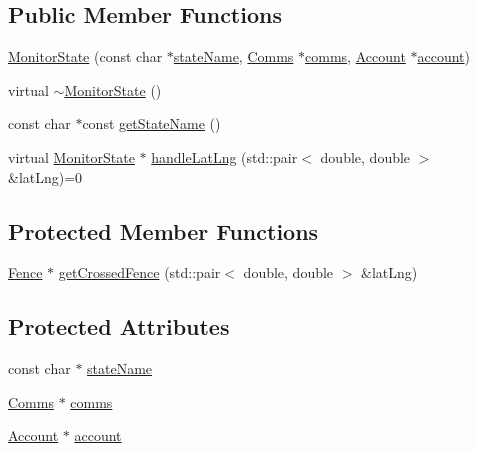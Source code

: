 \subsection*{Public Member Functions}
\begin{DoxyCompactItemize}
\item 
\hyperlink{class_monitor_state_ace027ab9e5703ac4e4b808eeebc3c961}{Monitor\+State} (const char $\ast$\hyperlink{class_monitor_state_aaeef0ae307bb9cfcbb4fcb08c115fb0f}{state\+Name}, \hyperlink{class_comms}{Comms} $\ast$\hyperlink{class_monitor_state_a41914e9963c67ef2d17774f04bad3518}{comms}, \hyperlink{class_account}{Account} $\ast$\hyperlink{class_monitor_state_a41128d4942ec0d5b107c63d1d95af811}{account})
\item 
virtual \hyperlink{class_monitor_state_a8dc9d7a46aa3d0190ec65b0d56167d3e}{$\sim$\+Monitor\+State} ()
\item 
const char $\ast$const \hyperlink{class_monitor_state_acb6d3a4de174058cb5b167fc04929ddb}{get\+State\+Name} ()
\item 
virtual \hyperlink{class_monitor_state}{Monitor\+State} $\ast$ \hyperlink{class_monitor_state_a8c8b871e3e8308e11f35905dd8741878}{handle\+Lat\+Lng} (std\+::pair$<$ double, double $>$ \&lat\+Lng)=0
\end{DoxyCompactItemize}
\subsection*{Protected Member Functions}
\begin{DoxyCompactItemize}
\item 
\hyperlink{class_fence}{Fence} $\ast$ \hyperlink{class_monitor_state_a332c5f42bf46cd217e36f300e5279766}{get\+Crossed\+Fence} (std\+::pair$<$ double, double $>$ \&lat\+Lng)
\end{DoxyCompactItemize}
\subsection*{Protected Attributes}
\begin{DoxyCompactItemize}
\item 
const char $\ast$ \hyperlink{class_monitor_state_aaeef0ae307bb9cfcbb4fcb08c115fb0f}{state\+Name}
\item 
\hyperlink{class_comms}{Comms} $\ast$ \hyperlink{class_monitor_state_a41914e9963c67ef2d17774f04bad3518}{comms}
\item 
\hyperlink{class_account}{Account} $\ast$ \hyperlink{class_monitor_state_a41128d4942ec0d5b107c63d1d95af811}{account}
\end{DoxyCompactItemize}


